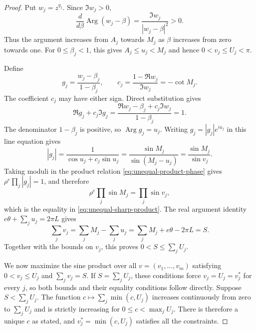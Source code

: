 \documentclass[11pt,a4paper]{article}
\theoremstyle{definition}
\theoremstyle{remark}
\numberwithin{equation}{section}
\begin{document}
\begin{proof}
Put $w_j=z^{q_j}$. Since $\Im w_j>0$,
\[
 \frac{d}{d\beta}\operatorname{Arg}(w_j-\beta)
 =\frac{\Im w_j}{|w_j-\beta|^2}>0.
\]
Thus the argument increases from $A_j$ towards $M_j$ as $\beta$ increases from zero towards one. For $0\le\beta_j<1$, this gives $A_j\le u_j<M_j$ and hence $0<v_j\le U_j<\pi$.

Define
\[
 g_j=\frac{w_j-\beta_j}{1-\beta_j},\qquad
 c_j=\frac{1-\Re w_j}{\Im w_j}=-\cot M_j.
\]
The coefficient $c_j$ may have either sign. Direct substitution gives
\[
 \Re g_j+c_j\Im g_j
 =\frac{\Re w_j-\beta_j+c_j\Im w_j}{1-\beta_j}=1.
\]
The denominator $1-\beta_j$ is positive, so $\operatorname{Arg}g_j=u_j$. Writing $g_j=|g_j|e^{iu_j}$ in this line equation gives
\[
 |g_j|=\frac1{\cos u_j+c_j\sin u_j}
 =\frac{\sin M_j}{\sin(M_j-u_j)}
 =\frac{\sin M_j}{\sin v_j}.
\]
Taking moduli in the product relation \eqref{eq:unequal-product-phase} gives $\rho^e\prod_j|g_j|=1$, and therefore
\[
 \rho^e\prod_j\sin M_j=\prod_j\sin v_j,
\]
which is the equality in \eqref{eq:unequal-sharp-product}. The real argument identity $e\theta+\sum_j u_j=2\pi L$ gives
\[
 \sum_jv_j=\sum_jM_j-\sum_ju_j
 =\sum_jM_j+e\theta-2\pi L=S.
\]
Together with the bounds on $v_j$, this proves $0<S\le\sum_jU_j$.

We now maximize the sine product over all $v=(v_1,\ldots,v_m)$ satisfying $0<v_j\le U_j$ and $\sum_jv_j=S$. If $S=\sum_jU_j$, these conditions force $v_j=U_j=v_j^*$ for every $j$, so both bounds and their equality conditions follow directly. Suppose $S<\sum_jU_j$. The function $c\mapsto\sum_j\min(c,U_j)$ increases continuously from zero to $\sum_jU_j$ and is strictly increasing for $0\le c<\max_jU_j$. There is therefore a unique $c$ as stated, and $v_j^*=\min(c,U_j)$ satisfies all the constraints.


\end{proof}
\end{document}
